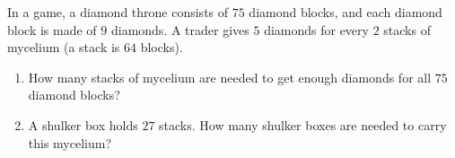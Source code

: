 In a game, a diamond throne consists of $75$ diamond blocks, and each diamond block is made of $9$ diamonds. A trader gives $5$ diamonds for every $2$ stacks of mycelium (a stack is $64$ blocks).
\begin{enumerate}
\item[(a)] How many stacks of mycelium are needed to get enough diamonds for all $75$ diamond blocks?
\item[(b)] A shulker box holds $27$ stacks. How many shulker boxes are needed to carry this mycelium?
\end{enumerate}
